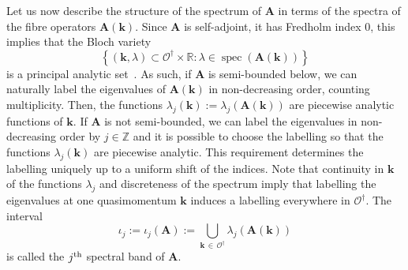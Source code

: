 \documentclass[10pt]{amsart}
\theoremstyle{definition}\newtheorem{defi}[theo]{Definition}\newtheorem{rema}[theo]{Remark}\newtheorem{exam}[theo]{Example}\newtheorem{nota}[theo]{Notation}
\DeclareMathOperator{\spec}{spec}
\newcommand{\R}{\mathbb R}
\newcommand{\Z}{\mathbb Z}
\newcommand{\CO}{\mathcal{O}}
\newcommand{\BA}{\mathbf A}
\newcommand{\bk}{\mathbf k}
\newcommand{\set}[1]{\left\{ #1 \right\}}
\begin{document}
Let us now describe the structure of the spectrum of $\BA$ in terms of the spectra of the fibre operators $\BA(\bk)$. Since $\BA$ is self-adjoint, it has Fredholm index $0$, this implies that the Bloch variety
\begin{equation}
\set{(\bk,\lambda) \subset \CO^\dagger \times \R : \lambda \in \spec(\BA(\bk))}
\end{equation}
is a principal analytic set~\cite[Corollary~3.1.6 and Section~3.4.C]{Kuchment}. As such, if $\BA$ is semi-bounded below, we can naturally label the eigenvalues of $\BA(\bk)$ in non-decreasing order, counting multiplicity. Then, the functions $\lambda_j(\bk):= \lambda_j(\BA(\bk))$ are piecewise analytic functions of $\bk$. If $\BA$ is not semi-bounded, we can label the eigenvalues in non-decreasing order by $j \in \Z$ and it is possible to choose the labelling so that the functions $\lambda_j(\bk)$ are piecewise analytic. This requirement determines the labelling uniquely up to a uniform shift of the indices. Note that continuity in $\bk$ of the functions $\lambda_j$ and discreteness of the spectrum imply that labelling the eigenvalues at one quasimomentum $\bk$ induces a labelling everywhere in $\CO^\dagger$. The interval
\begin{equation}
\iota_j:= \iota_j(\BA) := \bigcup_{\bk\,\in \,\CO^\dagger} \lambda_j(\BA(\bk))
\end{equation}
is called the $j^{\rm th}$ spectral band of $\BA$.
\end{document}
